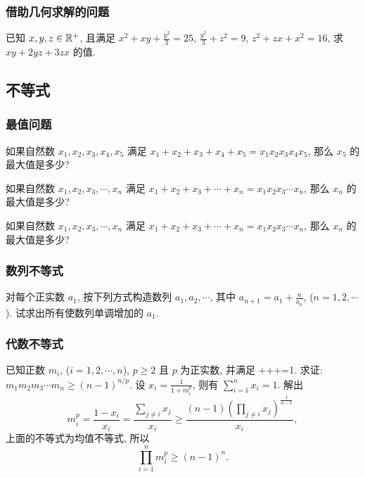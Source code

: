 \subsubsection{借助几何求解的问题}
已知 $x,y,z\in\mathbb{R}^+$, 且满足 $x^2+xy+\frac{y^2}{3}=25$, $\frac{y^2}{3}+z^2=9$, $z^2+zx+x^2=16$, 求 $xy+2yz+3zx$ 的值.
\eq

\subsection{不等式}

\subsubsection{最值问题}
如果自然数 $x_1,x_2,x_3,x_4,x_5$ 满足 $x_1+x_2+x_3+x_4+x_5=x_1x_2x_3x_4x_5$, 那么 $x_5$ 的最大值是多少?
\eq

如果自然数 $x_1,x_2,x_3,\cdots,x_n$ 满足 $x_1+x_2+x_3+\cdots+x_n=x_1x_2x_3\cdots x_n$, 那么 $x_n$ 的最大值是多少?
\eq

如果自然数 $x_1,x_2,x_3,\cdots,x_n$ 满足 $x_1+x_2+x_3+\cdots+x_n=x_1x_2x_3\cdots x_n$, 那么 $x_n$ 的最大值是多少?
\eq

\subsubsection{数列不等式}
对每个正实数 $a_1$, 按下列方式构造数列 $a_1,a_2,\cdots$, 其中 $a_{n+1}=a_1+\frac{n}{a_n}$, ($n=1,2,\cdots$). 试求出所有使数列单调增加的 $a_1$.
\eq

\subsubsection{代数不等式}
已知正数 $m_i$, ($i=1,2,\cdots, n$), $p\ge 2$ 且 $p$ 为正实数, 并满足
\bee
{}++\cdots+=1.
\eee
求证: $m_1m_2m_3\cdots m_n\ge(n-1)^{n/p}$.
\eq
\ba
设 $x_{i}=\frac{1}{1+m_{i}^{p}}$, 则有 $\sum_{i=1}^{n}x_{i}=1$. 解出
\[
m_{i}^{p}=\frac{1-x_{i}}{x_{i}}=\frac{\sum_{j\ne i}x_{j}}{x_{i}}\ge\frac{(n-1)\left(\prod_{j\ne i}x_{j}\right)^{\frac{1}{n-1}}}{x_{i}},
\]
上面的不等式为均值不等式, 所以
\[
\prod_{i=1}^{n}m_{i}^{p}\ge(n-1)^{n}.
\]
\ea

